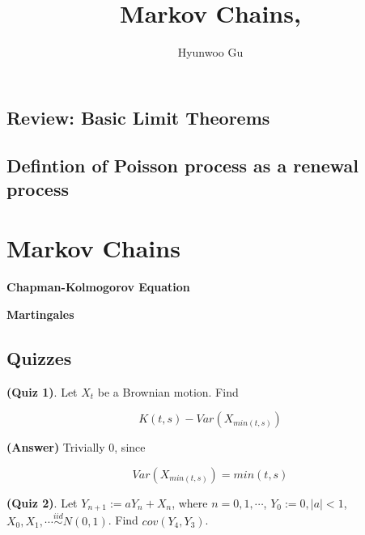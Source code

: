 \documentclass[12pt]{article}
\theoremstyle{nonumberbreak}
\begin{document}
\title{\textbf{Markov Chains, }}
\author{Hyunwoo Gu}
\date{}

\maketitle


\subsection{Review: Basic Limit Theorems}




\subsection{Defintion of Poisson process as a renewal process}




\pagebreak


\section{Markov Chains}


\textbf{Chapman-Kolmogorov Equation}



\textbf{Martingales}







\subsection*{Quizzes}

\textbf{(Quiz 1)}. Let $X_t$ be a Brownian motion. Find

$$
K(t,s) - Var(X_{min(t,s)})
$$


\textbf{(Answer)} Trivially $0$, since

$$
Var(X_{min(t,s)}) = min(t,s)
$$



\textbf{(Quiz 2)}. Let $Y_{n+1} := a Y_n + X_n$, where $n=0,1,\cdots$, $Y_0 := 0, |a| < 1$, $X_0, X_1, \cdots \overset{iid}{\sim} N(0,1)$. Find $cov(Y_4, Y_3)$. 
\end{document}
